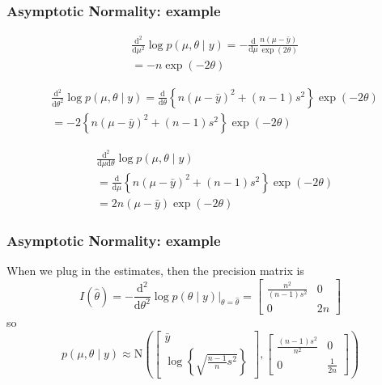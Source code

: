 \documentclass{beamer}
\begin{document}
\begin{frame}
\frametitle{Asymptotic Normality: example}

\begin{align*}
&\frac{\text{d}^2}{\text{d} \mu^2} \log p(\mu, \theta \mid y) = - \frac{\text{d}}{\text{d} \mu}  \frac{n(\mu - \bar{y})}{ \exp(2\theta) }  \\
&= - n \exp(-2\theta)
\end{align*}

\begin{align*}
& \frac{\text{d}^2}{\text{d} \theta^2} \log p(\mu, \theta \mid y) =  \frac{\text{d}}{\text{d} \theta} \left\{ n(\mu - \bar{y})^2 + (n-1)s^2 \right\} \exp(-2\theta) \\
&=  -2 \left\{ n(\mu - \bar{y})^2 + (n-1)s^2 \right\} \exp(-2\theta) 
\end{align*}

\begin{align*}
& \frac{\text{d}^2}{\text{d} \mu \text{d} \theta} \log p(\mu, \theta \mid y) \\
&=  \frac{\text{d}}{\text{d} \mu} \left\{ n(\mu - \bar{y})^2 + (n-1)s^2 \right\} \exp(-2\theta) \\
&=  2 n(\mu - \bar{y})\exp(-2\theta) 
\end{align*}


\end{frame}

\begin{frame}
\frametitle{Asymptotic Normality: example}

When we plug in the estimates, then the precision matrix is
$$
I(\hat{\theta} ) = 
-\frac{\text{d}^2}{\text{d}\theta^2} \log p(\theta \mid y) \bigg|_{\theta = \hat{\theta}} = 
\left[ \begin{array}{cc}
\frac{n^2}{(n-1)s^2} & 0 \\
0 & 2n
\end{array}\right]
$$
so
$$
p(\mu, \theta \mid y) \approx \text{N}\left(
\left[\begin{array}{c}
\bar{y}\\
\log \left\{ \sqrt{ \frac{n-1}{n}s^2}  \right\}
\end{array}\right],
\left[ \begin{array}{cc}
\frac{(n-1)s^2}{n^2} & 0 \\
0 & \frac{1}{2n}
\end{array}\right]
\right)
$$
\end{frame}
\end{document}
